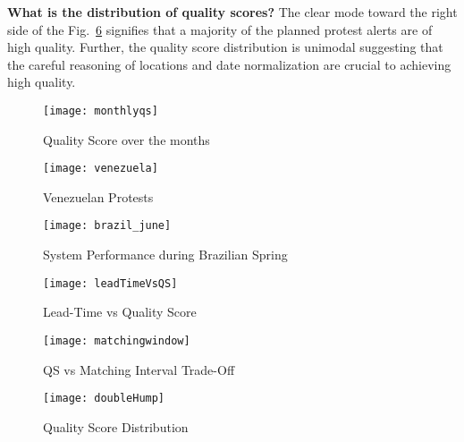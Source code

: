 \vspace{-0.5em}
\noindent
{\bf What is the distribution of quality scores?}
The clear mode toward the right side of the Fig.~\ref{fig:doubleHump} signifies that a majority of the planned 
protest alerts are of high quality. Further, the quality score distribution is unimodal suggesting that the careful
reasoning of locations and date normalization are crucial to achieving high quality.
\begin{figure*}
\centering
\begin{subfigure}{\columnwidth}
  \centering
  \texttt{[image: monthlyqs]}
  \vspace{-0.5em}
  \caption{Quality Score over the months}
  \label{fig:monthlyqs}
\end{subfigure}
\begin{subfigure}{\columnwidth}
  \centering
  \texttt{[image: venezuela]}
  \vspace{-0.5em}
  \caption{Venezuelan Protests}
  \label{fig:venezuela_feb}
\end{subfigure}
\begin{subfigure}{\columnwidth}
  \centering
  \texttt{[image: brazil\_june]}
  \vspace{-0.5em}
  \caption{System Performance during Brazilian Spring}
  \label{fig:brazil_june}
\end{subfigure}
\begin{subfigure}{\columnwidth}
  \centering
  \texttt{[image: leadTimeVsQS]}
  \vspace{-0.5em}
  \caption{Lead-Time vs Quality Score}
  \label{fig:leadTimeVsQS}
\end{subfigure}
\begin{subfigure}{\columnwidth}
  \centering
  \texttt{[image: matchingwindow]}
  \vspace{-0.5em}
  \caption{QS vs Matching Interval Trade-Off}
  \label{fig:matchinginterval}
\end{subfigure}
\begin{subfigure}{\columnwidth}
  \centering
  \texttt{[image: doubleHump]}
  \vspace{-1em}
  \caption{Quality Score Distribution}
  \label{fig:doubleHump}
\end{subfigure}
\caption{Evaluation of planned protest forecasting system}
\end{figure*}



